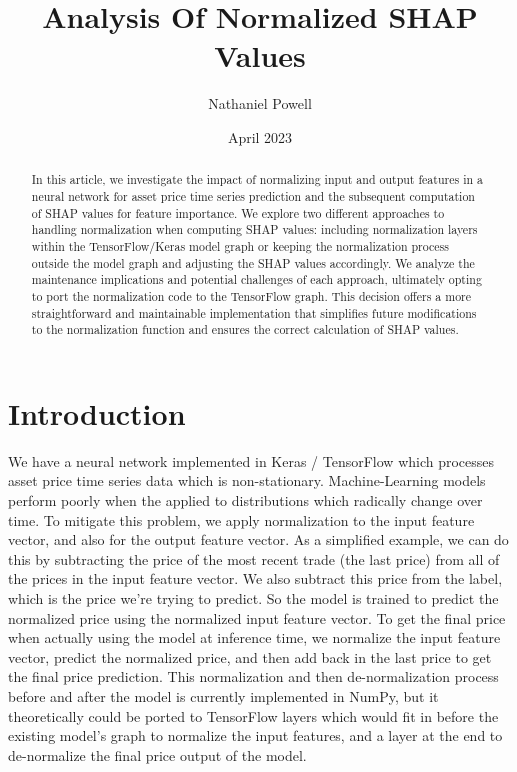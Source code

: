 \documentclass{article}
\title{Analysis Of Normalized SHAP Values}
\author{Nathaniel Powell}
\date{April 2023}
\begin{document}
\maketitle

\begin{abstract}
In this article, we investigate the impact of normalizing input and output features in a neural network for asset price time series prediction and the subsequent computation of SHAP values for feature importance. We explore two different approaches to handling normalization when computing SHAP values: including normalization layers within the TensorFlow/Keras model graph or keeping the normalization process outside the model graph and adjusting the SHAP values accordingly. We analyze the maintenance implications and potential challenges of each approach, ultimately opting to port the normalization code to the TensorFlow graph. This decision offers a more straightforward and maintainable implementation that simplifies future modifications to the normalization function and ensures the correct calculation of SHAP values.
\end{abstract}

\section{Introduction}

We have a neural network implemented in Keras / TensorFlow which processes asset price time series data which is non-stationary. Machine-Learning models perform poorly when the applied to distributions which radically change over time. To mitigate this problem, we apply normalization to the input feature vector, and also for the output feature vector. As a simplified example, we can do this by subtracting the price of the most recent trade (the last price) from all of the prices in the input feature vector. We also subtract this price from the label, which is the price we're trying to predict. So the model is trained to predict the normalized price using the normalized input feature vector. To get the final price when actually using the model at inference time, we normalize the input feature vector, predict the normalized price, and then add back in the last price to get the final price prediction. This normalization and then de-normalization process before and after the model is currently implemented in NumPy, but it theoretically could be ported to TensorFlow layers which would fit in before the existing model's graph to normalize the input features, and a layer at the end to de-normalize the final price output of the model. 
\end{document}
